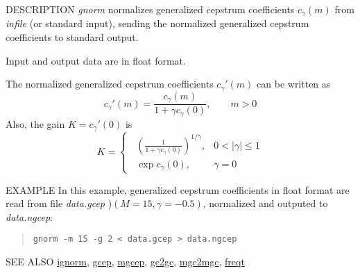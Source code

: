 \begin{qsection}{DESCRIPTION}
{\em gnorm} normalizes generalized cepstrum coefficients $c_\gamma(m)$ 
from {\em infile} (or standard input), 
sending the normalized generalized cepstrum coefficients to standard output.

Input and output data are in float format.

The normalized generalized cepstrum coefficients $c_\gamma'(m)$
can be written as
\begin{displaymath}
c_\gamma'(m) = \frac{c_\gamma(m)}{1+\gamma c_\gamma(0)}, \qquad m>0
\end{displaymath}
Also, the gain $K = c_\gamma'(0)$ is
\begin{displaymath}
K = \begin{cases} \;\;\displaystyle
	  \left(\frac{1}{1+\gamma c_\gamma(0)}\right)^{1/\gamma},
		& 0<|\gamma|\leq 1 \\ \;\;\displaystyle
	  \exp c_\gamma(0),  & \gamma=0
	\end{cases}
\end{displaymath}
\end{qsection}

\begin{options}
\end{options}

\begin{qsection}{EXAMPLE}
In this example, generalized cepstrum coefficients in float format
are read from file {\em data.gcep} )$(M=15, \gamma=-0.5)$,
normalized and outputed to {\em data.ngcep}:
\begin{quote}
 \verb!gnorm -m 15 -g 2 < data.gcep > data.ngcep!
\end{quote} 
\end{qsection}

\begin{qsection}{SEE ALSO}
\hyperlink{ignorm}{ignorm},
\hyperlink{gcep}{gcep},
\hyperlink{mgcep}{mgcep},
\hyperlink{gc2gc}{gc2gc},
\hyperlink{mgc2mgc}{mgc2mgc},
\hyperlink{freqt}{freqt}
\end{qsection}
